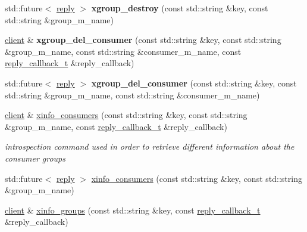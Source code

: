 \begin{DoxyCompactItemize}
\item 
\mbox{\label{classcpp__redis_1_1client_a22440ee971e442a217098e0a55c1d5c7}} 
std\+::future$<$ \mbox{\hyperlink{classcpp__redis_1_1reply}{reply}} $>$ {\bfseries xgroup\+\_\+destroy} (const std\+::string \&key, const std\+::string \&group\+\_\+m_name)
\item 
\mbox{\label{classcpp__redis_1_1client_a02aaed2ec3345ff5686f79fc7c1ba765}} 
\mbox{\hyperlink{classcpp__redis_1_1client}{client}} \& {\bfseries xgroup\+\_\+del\+\_\+consumer} (const std\+::string \&key, const std\+::string \&group\+\_\+m_name, const std\+::string \&consumer\+\_\+m_name, const \mbox{\hyperlink{classcpp__redis_1_1client_af7a65eb21aa25230bfbb0b0203c4fc04}{reply\+\_\+callback\+\_\+t}} \&reply\+\_\+callback)
\item 
\mbox{\label{classcpp__redis_1_1client_a428d246b816234a80e21a1e0b2e0b922}} 
std\+::future$<$ \mbox{\hyperlink{classcpp__redis_1_1reply}{reply}} $>$ {\bfseries xgroup\+\_\+del\+\_\+consumer} (const std\+::string \&key, const std\+::string \&group\+\_\+m_name, const std\+::string \&consumer\+\_\+m_name)
\item 
\mbox{\hyperlink{classcpp__redis_1_1client}{client}} \& \mbox{\hyperlink{classcpp__redis_1_1client_a972e59c216b86e38a1b77a4ca0bc6785}{xinfo\+\_\+consumers}} (const std\+::string \&key, const std\+::string \&group\+\_\+m_name, const \mbox{\hyperlink{classcpp__redis_1_1client_af7a65eb21aa25230bfbb0b0203c4fc04}{reply\+\_\+callback\+\_\+t}} \&reply\+\_\+callback)
\begin{DoxyCompactList}\small\item\em introspection command used in order to retrieve different information about the consumer groups \end{DoxyCompactList}\item 
std\+::future$<$ \mbox{\hyperlink{classcpp__redis_1_1reply}{reply}} $>$ \mbox{\hyperlink{classcpp__redis_1_1client_a6497165de42557c953189305a0f22542}{xinfo\+\_\+consumers}} (const std\+::string \&key, const std\+::string \&group\+\_\+m_name)
\item 
\mbox{\hyperlink{classcpp__redis_1_1client}{client}} \& \mbox{\hyperlink{classcpp__redis_1_1client_a99175a1ba56a05cc75c531860aaf5442}{xinfo\+\_\+groups}} (const std\+::string \&key, const \mbox{\hyperlink{classcpp__redis_1_1client_af7a65eb21aa25230bfbb0b0203c4fc04}{reply\+\_\+callback\+\_\+t}} \&reply\+\_\+callback)

\end{DoxyCompactItemize}

